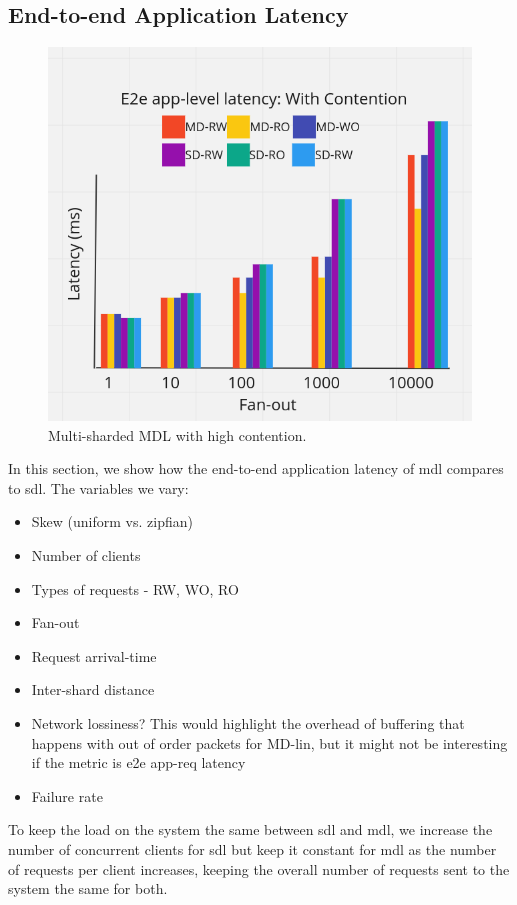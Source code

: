 \subsection{End-to-end Application Latency}
\begin{figure}[!htb]
\includegraphics[scale=.32]{e2e-with-contention.png}
\caption{Multi-sharded MDL with high contention.}
\label{fig:e2e-contention}
\end{figure}
In this section, we show how the end-to-end application latency of mdl compares to sdl.
The variables we vary:
\begin{itemize}
    \item Skew (uniform vs. zipfian)
    \item Number of clients
    \item Types of requests - RW, WO, RO
    \item Fan-out
    \item Request arrival-time
    \item Inter-shard distance
    \item Network lossiness?
        \subitem This would highlight the overhead of buffering that happens with out of order packets for MD-lin, but it might not be interesting if the metric is e2e app-req latency
    \item Failure rate
\end{itemize}
To keep the load on the system the same between sdl and mdl, we increase the number of concurrent clients for sdl but keep it constant for mdl as the number of requests per client increases, keeping the overall number of requests sent to the system the same for both.

